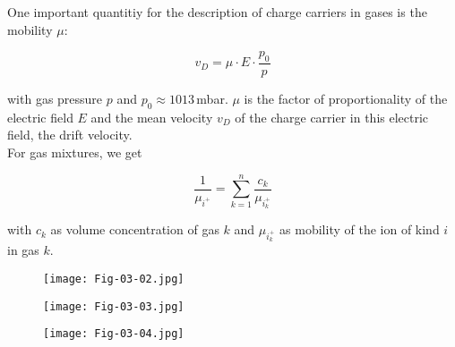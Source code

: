 One important quantitiy for the description of charge carriers in gases is the mobility $\mu$:

\[v_D = \mu\cdot E \cdot \frac{p_0}{p}  \]

with gas pressure $p$ and $p_0\approx 1013\,$mbar. $\mu$ is the factor of proportionality of the
electric field $E$ and the mean velocity $v_D$ of the charge carrier in this electric field, the
drift velocity.
\\
For gas mixtures, we get

\[\frac{1}{\mu_{i^+}} = \sum_{k=1}^n \frac{c_k}{\mu_{i^+_k}}  \]

with $c_k$ as volume concentration of gas $k$ and $\mu_{i^+_k}$ as mobility of the ion of kind $i$
in gas $k$.


\begin{figure}[H]
	\centering
	\texttt{[image: Fig-03-02.jpg]}
\end{figure}

\begin{figure}[H]
	\centering
	\texttt{[image: Fig-03-03.jpg]}
\end{figure}

\begin{figure}[H]
	\centering
	\texttt{[image: Fig-03-04.jpg]}
\end{figure}

